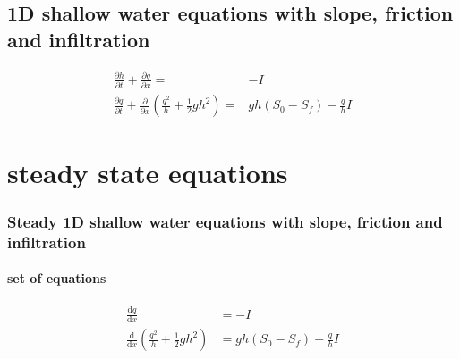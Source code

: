 \subsection{1D shallow water equations with slope, friction and infiltration}
\begin{subequations}
\label{eq:1DSWeq_FIS}
\begin{align}
      \displaystyle{\frac{\partial h}{\partial t}}+\frac{\partial q}{\partial x} = & - I \label{eq:1DSWeq_mass_FIS}\\
      \displaystyle{\frac{\partial q}{\partial t}} + \frac{\partial}{\partial x}\left(\frac{q^2}{h}+\frac{1}{2}gh^2\right)=& gh\left(S_0-S_f\right) - \displaystyle{\frac{q}{h}} I \label{eq:1DSWeq_momentum_FIS}
   \end{align}
\end{subequations}

\section{steady state equations}
\subsubsection{Steady 1D shallow water equations with slope, friction and infiltration}
\paragraph{set of equations}
\begin{subequations}
\label{eq:1DSWeq_steady_FIS}
\begin{align}
\displaystyle{\frac{\mathrm{d} q}{\mathrm{d}x}} &= -I \label{eq:1DSWeq_mass_steady_FIS}\\
\displaystyle{\frac{\mathrm{d}}{\mathrm{d} x}\left(\frac{q^2}{h}+\frac{1}{2}gh^2\right)}&=gh\left(S_0 - S_f\right) - \frac{q}{h} I \label{eq:1DSWeq_momentum_steady_FIS}
\end{align}
\end{subequations}
